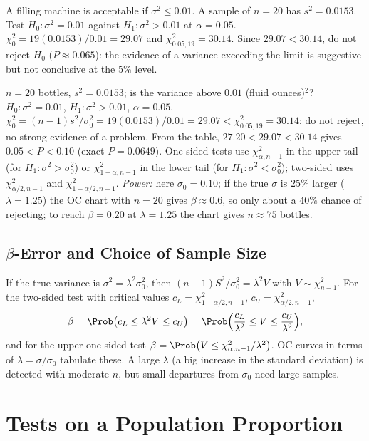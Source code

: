 \begin{example}\label{ex:vartest}
A filling machine is acceptable if $\sigma^2\le0.01$. A sample of $n=20$ has $s^2=0.0153$. Test $H_0:\sigma^2=0.01$ against $H_1:\sigma^2>0.01$ at $\alpha=0.05$. $\chi_0^2=19(0.0153)/0.01=29.07$ and $\chi^2_{0.05,19}=30.14$. Since $29.07<30.14$, do not reject $H_0$ ($P\approx0.065$): the evidence of a variance exceeding the limit is suggestive but not conclusive at the $5\%$ level.
\end{example}

\begin{example}
$n=20$ bottles, $s^2=0.0153$; is the variance above $0.01$ (fluid ounces)$^2$? $H_0:\sigma^2=0.01$, $H_1:\sigma^2>0.01$, $\alpha=0.05$. $\chi_0^2=(n-1)s^2/\sigma_0^2=19(0.0153)/0.01=29.07<\chi^2_{0.05,19}=30.14$: do not reject, no strong evidence of a problem. From the table, $27.20<29.07<30.14$ gives $0.05<P<0.10$ (exact $P=0.0649$). One-sided tests use $\chi^2_{\alpha,n-1}$ in the upper tail (for $H_1:\sigma^2>\sigma_0^2$) or $\chi^2_{1-\alpha,n-1}$ in the lower tail (for $H_1:\sigma^2<\sigma_0^2$); two-sided uses $\chi^2_{\alpha/2,n-1}$ and $\chi^2_{1-\alpha/2,n-1}$. \emph{Power:} here $\sigma_0=0.10$; if the true $\sigma$ is $25\%$ larger ($\lambda=1.25$) the OC chart with $n=20$ gives $\beta\approx0.6$, so only about a $40\%$ chance of rejecting; to reach $\beta=0.20$ at $\lambda=1.25$ the chart gives $n\approx75$ bottles.
\end{example}

\subsection{$\beta$-Error and Choice of Sample Size}

If the true variance is $\sigma^2=\lambda^2\sigma_0^2$, then $(n-1)S^2/\sigma_0^2=\lambda^2V$ with $V\sim\chi^2_{n-1}$. For the two-sided test with critical values $c_L=\chi^2_{1-\alpha/2,n-1}$, $c_U=\chi^2_{\alpha/2,n-1}$,
\[ \beta=\Prob\big(c_L\le\lambda^2V\le c_U\big)=\Prob\Big(\frac{c_L}{\lambda^2}\le V\le\frac{c_U}{\lambda^2}\Big), \]
and for the upper one-sided test $\beta=\Prob\big(V\le\chi^2_{\alpha,n-1}/\lambda^2\big)$. OC curves in terms of $\lambda=\sigma/\sigma_0$ tabulate these. A large $\lambda$ (a big increase in the standard deviation) is detected with moderate $n$, but small departures from $\sigma_0$ need large samples.

\section{Tests on a Population Proportion}

